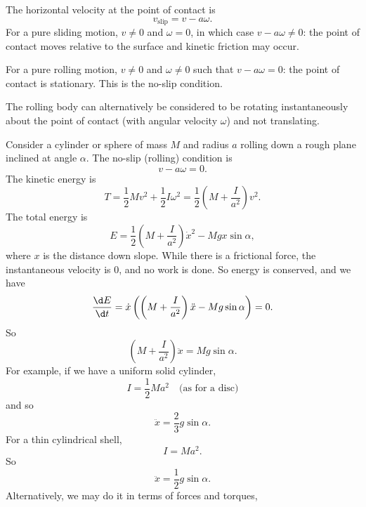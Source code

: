 \documentclass[a4paper]{article}
\begin{document}
The horizontal velocity at the point of contact is
\[
  v_{\text{slip}} = v - a\omega.
\]
For a pure sliding motion, $v \not = 0$ and $\omega = 0$, in which case $v - a\omega \not = 0$: the point of contact moves relative to the surface and kinetic friction may occur.

For a pure rolling motion, $v\not = 0$ and $\omega \not = 0$ such that $v - a\omega = 0$: the point of contact is stationary. This is the no-slip condition.

The rolling body can alternatively be considered to be rotating instantaneously about the point of contact (with angular velocity $\omega$) and not translating.

\begin{eg}\leavevmode
  \begin{center}
  \end{center}
  Consider a cylinder or sphere of mass $M$ and radius $a$ rolling down a rough plane inclined at angle $\alpha$. The no-slip (rolling) condition is
  \[
    v - a\omega = 0 .
  \]
  The kinetic energy is
  \[
    T = \frac{1}{2}Mv^2 + \frac{1}{2}I\omega^2 = \frac{1}{2}\left(M + \frac{I}{a^2}\right)v^2.
  \]
  The total energy is
  \[
    E = \frac{1}{2}\left(M + \frac{I}{a^2}\right) \dot{x}^2 - Mgx\sin \alpha,
  \]
  where $x$ is the distance down slope. While there is a frictional force, the instantaneous velocity is $0$, and no work is done. So energy is conserved, and we have
  \[
    \frac{\d E}{\d t} = \dot{x}\left(\left(M + \frac{I}{a^2}\right)\ddot{x} - Mg\sin \alpha\right) = 0.
  \]
  So
  \[
    \left(M + \frac{I}{a^2}\right)\ddot{x} = Mg\sin \alpha.
  \]
  For example, if we have a uniform solid cylinder,
  \[
    I = \frac{1}{2}Ma^2\quad\text{(as for a disc)}
  \]
  and so
  \[
    \ddot{x} = \frac{2}{3}g\sin \alpha.
  \]
  For a thin cylindrical shell,
  \[
    I = Ma^2.
  \]
  So
  \[
    \ddot{x} = \frac{1}{2}g\sin \alpha.
  \]
  Alternatively, we may do it in terms of forces and torques,

\end{eg}
\end{document}
